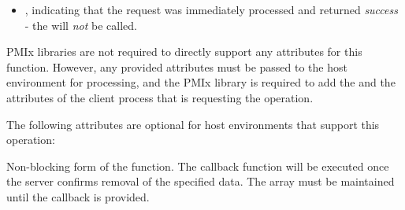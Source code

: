 \returnsimplenb

\returnstart
\begin{itemize}
    \item {}, indicating that the request was immediately processed and returned \textit{success} - the  will \textit{not} be called.
\end{itemize}
\returnend

\reqattrstart
\ac{PMIx} libraries are not required to directly support any attributes for this function. However, any provided attributes must be passed to the host environment for processing, and the \ac{PMIx} library is required to add the  and the  attributes of the client process that is requesting the operation.

\reqattrend

\optattrstart
The following attributes are optional for host environments that support this operation:


\optattrend

\descr

Non-blocking form of the  function.
The callback function will be executed once the server confirms removal of the specified data. The  array must be maintained until the callback is provided.


